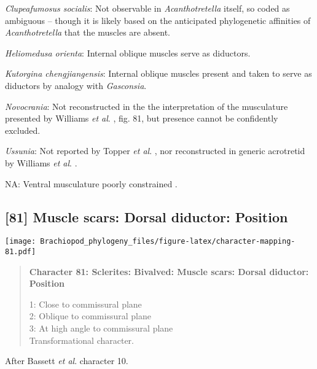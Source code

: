 \documentclass[openany]{book}
\theoremstyle{definition}
\theoremstyle{definition}
\theoremstyle{definition}
\theoremstyle{remark}
\begin{document}
\hypertarget{Clupeafumosus_socialis-coding-80}{}
\emph{Clupeafumosus socialis}: Not observable in \emph{Acanthotretella}
itself, so coded as ambiguous -- though it is likely based on the
anticipated phylogenetic affinities of \emph{Acanthotretella} that the
muscles are absent.

\hypertarget{Heliomedusa_orienta-coding-80}{}
\emph{Heliomedusa orienta}: Internal oblique muscles serve as diductors.

\hypertarget{Kutorgina_chengjiangensis-coding-80}{}
\emph{Kutorgina chengjiangensis}: Internal oblique muscles present
\citep{Nikitin1984} and taken to serve as diductors by analogy with
\emph{Gasconsia}.

\hypertarget{Novocrania-coding-80}{}
\emph{Novocrania}: Not reconstructed in the the interpretation of the
musculature presented by Williams \emph{et al}.
\citeyearpar{Williams2000LinguliformeaCraniiformea}, fig. 81, but
presence cannot be confidently excluded.

\hypertarget{Ussunia-coding-80}{}
\emph{Ussunia}: Not reported by Topper \emph{et al}.
\citeyearpar{Topper2013Reappraisalof}, nor reconstructed in generic
acrotretid by Williams \emph{et al}.
\citeyearpar{Williams2000LinguliformeaCraniiformea}.

\hypertarget{NA-coding-80}{}
NA: Ventral musculature poorly constrained
\citep{Williams2000LinguliformeaCraniiformea, Popov2009Earlyontogeny}.

\subsection*{{[}81{]} Muscle scars: Dorsal diductor:
Position}\label{muscle-scars-dorsal-diductor-position}

\texttt{[image: Brachiopod\_phylogeny\_files/figure-latex/character-mapping-81.pdf]}

\begin{quote}
\textbf{Character 81: Sclerites: Bivalved: Muscle scars: Dorsal
diductor: Position}

1: Close to commissural plane\\
2: Oblique to commissural plane\\
3: At high angle to commissural plane\\
Transformational character.
\end{quote}

After Bassett \emph{et al}.
\citeyearpar{Bassett2001Functionalmorphology} character 10.
\end{document}
